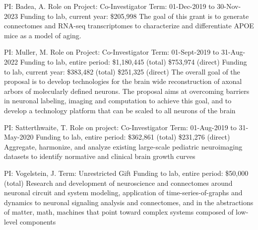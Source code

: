 \documentclass[10pt,colorlinks=true,urlcolor=blue]{moderncv}
\begin{document}
{\newline PI: Badea, A.
\newline Role on Project: Co-Investigator
\newline Term: 01-Dec-2019 to 30-Nov-2023
\newline Funding to lab, current year: \$205,998
\newline The goal of this grant is to generate connectomes and RNA-seq transcriptomes to characterize and differentiate APOE mice as a model of aging.
}{}{}{}



{\newline PI: Muller, M.
\newline Role on Project: Co-Investigator
\newline Term: 01-Sept-2019 to 31-Aug-2022
\newline Funding to lab, entire period: \$1,180,445 (total) \$753,974 (direct) 
\newline Funding to lab, current year: \$383,482 (total) \$251,325 (direct)
\newline The overall goal of the proposal is to develop technologies for the brain wide reconstruction
of axonal arbors of molecularly defined neurons. The proposal aims at overcoming barriers
in neuronal labeling, imaging and computation to achieve this goal, and to develop a
technology platform that can be scaled to all neurons of the brain}{}{}{}

{\newline PI: Satterthwaite, T.
\newline Role on project: Co-Investigator
\newline Term: 01-Aug-2019 to 31-May-2020
\newline Funding to lab, entire period: \$362,861 (total) \$231,276 (direct)
\newline Aggregate, harmonize, and analyze existing large-scale pediatric neuroimaging datasets to
identify normative and clinical brain growth curves}{}{}{}

{\newline PI: Vogelstein, J.
\newline Term: Unrestricted Gift
\newline Funding to lab, entire period: \$50,000 (total)
\newline Research and development of neuroscience and connectomes around neuronal circuit and
system modeling, application of time-series-of-graphs and dynamics to neuronal signaling
analysis and connectomes, and in the abstractions of matter, math, machines that point
toward complex systems composed of low-level components}{}{}{}{}
\end{document}
